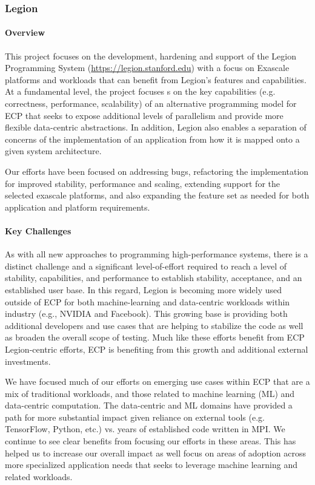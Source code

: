 \subsubsection{ Legion}

\paragraph{Overview}
This project focuses on the development, hardening and support of the
Legion Programming System (\url{https://legion.stanford.edu}) with a
focus on Exascale platforms and workloads that can benefit from
Legion's features and capabilities.  At a fundamental level, the
project focuses s on the key capabilities (e.g. correctness,
performance, scalability) of an alternative programming model for ECP
that seeks to expose additional levels of parallelism and provide more
flexible data-centric abstractions.  In addition, Legion also enables
a separation of concerns of the implementation of an application from
how it is mapped onto a given system architecture.

Our efforts have been focused on addressing bugs, refactoring the
implementation for improved stability, performance and scaling,
extending support for the selected exascale platforms, and also
expanding the feature set as needed for both application and
platform requirements.

\paragraph{Key Challenges}
As with all new approaches to programming high-performance systems,
there is a distinct challenge and a significant level-of-effort required to
reach a level of stability, capabilities, and performance to establish
stability, acceptance, and an established user base.  In this
regard, Legion is becoming more widely used outside of ECP for both
machine-learning and data-centric workloads within industry (e.g.,
NVIDIA and Facebook).  This growing base is providing both additional
developers and use cases that are helping to stabilize the code as
well as broaden the overall scope of testing.  Much like these efforts
benefit from ECP Legion-centric efforts, ECP is benefiting from this
growth and additional external investments.

We have focused much of our efforts on emerging use cases within ECP
that are a mix of traditional workloads, and those related to machine
learning (ML) and data-centric computation.  The data-centric and ML
domains have provided a path for more substantial impact given reliance
on external tools (e.g. TensorFlow, Python, etc.) vs. years of established code
written in MPI.  We continue to see clear benefits from focusing our efforts in
these areas. This has helped us to increase our overall impact as well focus on
areas of adoption across more specialized application needs that seeks to leverage
machine learning and related workloads.

